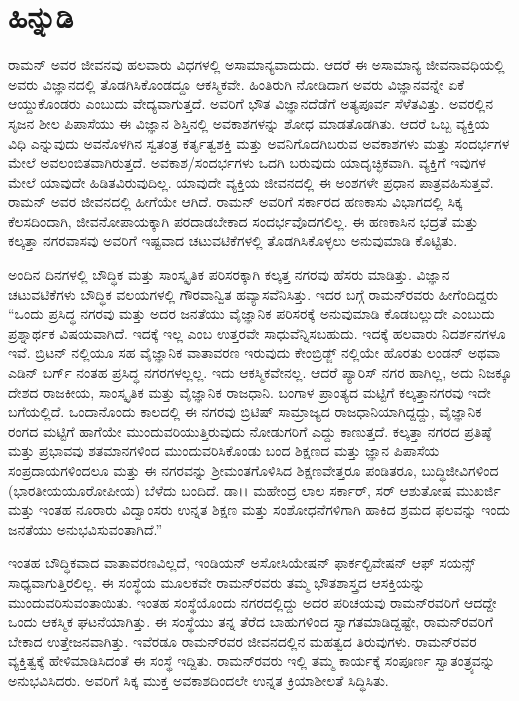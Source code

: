 
\chapter*{ಹಿನ್ನುಡಿ}

\thispagestyle{plain}

ರಾಮನ್ ಅವರ ಜೀವನವು ಹಲವಾರು ವಿಧಗಳಲ್ಲಿ ಅಸಾಮಾನ್ಯವಾದುದು. ಆದರೆ ಈ ಅಸಾಮಾನ್ಯ ಜೀವನಾವಧಿಯಲ್ಲಿ ಅವರು ವಿಜ್ಞಾನದಲ್ಲಿ ತೊಡಗಿಸಿಕೊಂಡದ್ದೂ ಆಕಸ್ಮಿಕವೇ. ಹಿಂತಿರುಗಿ ನೋಡಿದಾಗ ಅವರು ವಿಜ್ಞಾನವನ್ನೇ ಏಕೆ ಆಯ್ದುಕೊಂಡರು ಎಂಬುದು ವೇದ್ಯವಾಗುತ್ತದೆ. ಅವರಿಗೆ ಭೌತ ವಿಜ್ಞಾನದೆಡೆಗೆ ಅತ್ಯಪೂರ್ವ ಸೆಳೆತವಿತ್ತು. ಅವರಲ್ಲಿನ ಸೃಜನ ಶೀಲ ಪಿಪಾಸೆಯು ಈ ವಿಜ್ಞಾನ ಶಿಸ್ತಿನಲ್ಲಿ ಅವಕಾಶಗಳನ್ನು ಶೋಧ ಮಾಡತೊಡಗಿತು. ಆದರೆ ಒಬ್ಬ ವ್ಯಕ್ತಿಯ ವಿಧಿ ಎನ್ನುವುದು ಅವನೊಳಗಿನ ಸ್ವತಂತ್ರ ಕರ್ತೃತ್ವಶಕ್ತಿ ಮತ್ತು ಅವನಿಗೊದಗಿಬರುವ ಅವಕಾಶಗಳು ಮತ್ತು ಸಂದರ್ಭಗಳ ಮೇಲೆ ಅವಲಂಬಿತವಾಗಿರುತ್ತದೆ. ಅವಕಾಶ/ಸಂದರ್ಭಗಳು ಒದಗಿ ಬರುವುದು ಯಾದೃಚ್ಛಿಕವಾಗಿ. ವ್ಯಕ್ತಿಗೆ ಇವುಗಳ ಮೇಲೆ ಯಾವುದೇ ಹಿಡಿತವಿರುವುದಿಲ್ಲ. ಯಾವುದೇ ವ್ಯಕ್ತಿಯ ಜೀವನದಲ್ಲಿ ಈ ಅಂಶಗಳೇ ಪ್ರಧಾನ ಪಾತ್ರವಹಿಸುತ್ತವೆ. ರಾಮನ್ ಅವರ ಜೀವನದಲ್ಲಿ ಹೀಗೆಯೇ ಆಗಿದೆ. ರಾಮನ್ ಅವರಿಗೆ ಸರ್ಕಾರದ ಹಣಕಾಸು ವಿಭಾಗದಲ್ಲಿ ಸಿಕ್ಕ ಕೆಲಸದಿಂದಾಗಿ, ಜೀವನೋಪಾಯಕ್ಕಾಗಿ ಪರದಾಡಬೇಕಾದ ಸಂದರ್ಭವೊದಗಲಿಲ್ಲ. ಈ ಹಣಕಾಸಿನ ಭದ್ರತೆ ಮತ್ತು ಕಲ್ಕತ್ತಾ ನಗರವಾಸವು ಅವರಿಗೆ ಇಷ್ಟವಾದ ಚಟುವಟಿಕೆಗಳಲ್ಲಿ ತೊಡಗಿಸಿಕೊಳ್ಳಲು ಅನುವುಮಾಡಿ ಕೊಟ್ಟಿತು.

ಅಂದಿನ ದಿನಗಳಲ್ಲಿ ಬೌದ್ಧಿಕ ಮತ್ತು ಸಾಂಸ್ಕೃತಿಕ ಪರಿಸರಕ್ಕಾಗಿ ಕಲ್ಕತ್ತ ನಗರವು ಹೆಸರು ಮಾಡಿತ್ತು. ವಿಜ್ಞಾನ ಚಟುವಟಿಕೆಗಳು ಬೌದ್ಧಿಕ ವಲಯಗಳಲ್ಲಿ ಗೌರವಾನ್ವಿತ ಹವ್ಯಾಸವೆನಿಸಿತ್ತು. ಇದರ ಬಗ್ಗೆ ರಾಮನ್‍ರವರು ಹೀಗೆಂದಿದ್ದರು “ಒಂದು ಪ್ರಸಿದ್ಧ ನಗರವು ಮತ್ತು ಅದರ ಜನತೆಯು ವೈಜ್ಞಾನಿಕ ಪರಿಸರಕ್ಕೆ ಅನುವುಮಾಡಿ ಕೊಡಬಲ್ಲುದೇ ಎಂಬುದು ಪ್ರಶ್ನಾರ್ಥಕ ವಿಷಯವಾಗಿದೆ. ಇದಕ್ಕೆ ಇಲ್ಲ ಎಂಬ ಉತ್ತರವೇ ಸಾಧುವೆನ್ನಿಸಬಹುದು. ಇದಕ್ಕೆ ಹಲವಾರು ನಿದರ್ಶನಗಳೂ ಇವೆ. ಬ್ರಿಟನ್ ನಲ್ಲಿಯೂ ಸಹ ವೈಜ್ಞಾನಿಕ ವಾತಾವರಣ ಇರುವುದು ಕೇಂಬ್ರಿಡ್ಜ್ ನಲ್ಲಿಯೇ ಹೊರತು ಲಂಡನ್ ಅಥವಾ ಎಡಿನ್ ಬರ್ಗ್ ನಂತಹ ಪ್ರಸಿದ್ಧ ನಗರಗಳಲ್ಲಲ್ಲ. ಇದು ಆಕಸ್ಮಿಕವೇನಲ್ಲ. ಆದರೆ ಪ್ಯಾರಿಸ್ ನಗರ ಹಾಗಿಲ್ಲ, ಅದು ನಿಜಕ್ಕೂ ದೇಶದ ರಾಜಕೀಯ, ಸಾಂಸ್ಕೃತಿಕ ಮತ್ತು ವೈಜ್ಞಾನಿಕ ರಾಜಧಾನಿ. ಬಂಗಾಳ ಪ್ರಾಂತ್ಯದ ಮಟ್ಟಿಗೆ ಕಲ್ಕತ್ತಾನಗರವು ಇದೇ ಬಗೆಯಲ್ಲಿದೆ. ಒಂದಾನೊಂದು ಕಾಲದಲ್ಲಿ ಈ ನಗರವು ಬ್ರಿಟಿಷ್ ಸಾಮ್ರಾಜ್ಯದ ರಾಜಧಾನಿಯಾಗಿದ್ದದ್ದು, ವೈಜ್ಞಾನಿಕ ರಂಗದ ಮಟ್ಟಿಗೆ ಹಾಗೆಯೇ ಮುಂದುವರಿಯುತ್ತಿರುವುದು ನೋಡುಗರಿಗೆ ಎದ್ದು ಕಾಣುತ್ತದೆ. ಕಲ್ಕತ್ತಾ ನಗರದ ಪ್ರತಿಷ್ಠೆ ಮತ್ತು ಪ್ರಭಾವವು ಶತಮಾನಗಳಿಂದ ಮುಂದುವರಿಸಿಕೊಂಡು ಬಂದ ಶಿಕ್ಷಣದ ಮತ್ತು ಜ್ಞಾನ ಪಿಪಾಸೆಯ ಸಂಪ್ರದಾಯಗಳಿಂದಲೂ ಮತ್ತು ಈ ನಗರವನ್ನು ಶ‍್ರೀಮಂತಗೊಳಿಸಿದ ಶಿಕ್ಷಣವೇತ್ತರೂ ಪಂಡಿತರೂ, ಬುದ್ಧಿಜೀವಿಗಳಿಂದ (ಭಾರತೀಯ\enginline{--}ಯೂರೋಪೀಯ) ಬೆಳೆದು ಬಂದಿದೆ. ಡಾ।। ಮಹೇಂದ್ರ ಲಾಲ ಸರ್ಕಾರ್, ಸರ್ ಆಶುತೋಷ ಮುಖರ್ಜಿ ಮತ್ತು ಇಂತಹ ನೂರಾರು ವಿದ್ವಾಂಸರು ಉನ್ನತ ಶಿಕ್ಷಣ ಮತ್ತು ಸಂಶೋಧನೆಗಳಿಗಾಗಿ ಹಾಕಿದ ಶ್ರಮದ ಫಲವನ್ನು ಇಂದು ಜನತೆಯು ಅನುಭವಿಸುವಂತಾಗಿದೆ.”

ಇಂತಹ ಬೌದ್ಧಿಕವಾದ ವಾತಾವರಣವಿಲ್ಲದೆ, ಇಂಡಿಯನ್ ಅಸೋಸಿಯೇಷನ್ ಫಾರ್\break ಕಲ್ಟಿವೇಷನ್ ಆಫ್ ಸಯನ್ಸ್ ಸಾಧ್ಯವಾಗುತ್ತಿರಲಿಲ್ಲ. ಈ ಸಂಸ್ಥೆಯ ಮೂಲಕವೇ ರಾಮನ್‍ರವರು ತಮ್ಮ ಭೌತಶಾಸ್ತ್ರದ ಆಸಕ್ತಿಯನ್ನು ಮುಂದುವರಿಸುವಂತಾಯಿತು. ಇಂತಹ ಸಂಸ್ಥೆಯೊಂದು ನಗರದಲ್ಲಿದ್ದು ಅದರ ಪರಿಚಯವು ರಾಮನ್‍ರವರಿಗೆ ಆದದ್ದೇ ಒಂದು ಆಕಸ್ಮಿಕ ಘಟನೆಯಾಗಿತ್ತು. ಈ ಸಂಸ್ಥೆಯು ತನ್ನ ತೆರೆದ ಬಾಹುಗಳಿಂದ ಸ್ವಾಗತಮಾಡಿದ್ದಷ್ಟೇ, ರಾಮನ್‍ರವರಿಗೆ ಬೇಕಾದ ಉತ್ತೇಜನವಾಗಿತ್ತು. ಇವೆರಡೂ ರಾಮನ್‍ರವರ ಜೀವನದಲ್ಲಿನ ಮಹತ್ವದ ತಿರುವುಗಳು. ರಾಮನ್‍ರವರ ವ್ಯಕ್ತಿತ್ವಕ್ಕೆ ಹೇಳಿಮಾಡಿಸಿದಂತೆ ಈ ಸಂಸ್ಥೆ ಇದ್ದಿತು. ರಾಮನ್‍ರವರು ಇಲ್ಲಿ ತಮ್ಮ ಕಾರ್ಯಕ್ಕೆ ಸಂಪೂರ್ಣ ಸ್ವಾತಂತ್ರ್ಯವನ್ನು ಅನುಭವಿಸಿದರು. ಅವರಿಗೆ ಸಿಕ್ಕ ಮುಕ್ತ ಅವಕಾಶದಿಂದಲೇ ಉನ್ನತ ಕ್ರಿಯಾಶೀಲತೆ ಸಿದ್ಧಿಸಿತು.

